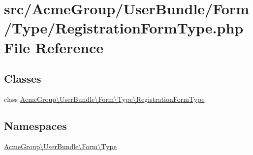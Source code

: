 \hypertarget{_registration_form_type_8php}{\section{src/\+Acme\+Group/\+User\+Bundle/\+Form/\+Type/\+Registration\+Form\+Type.php File Reference}
\label{_registration_form_type_8php}
}
\subsection*{Classes}
\begin{DoxyCompactItemize}
\item 
class \hyperlink{class_acme_group_1_1_user_bundle_1_1_form_1_1_type_1_1_registration_form_type}{Acme\+Group\textbackslash{}\+User\+Bundle\textbackslash{}\+Form\textbackslash{}\+Type\textbackslash{}\+Registration\+Form\+Type}
\end{DoxyCompactItemize}
\subsection*{Namespaces}
\begin{DoxyCompactItemize}
\item 
 \hyperlink{namespace_acme_group_1_1_user_bundle_1_1_form_1_1_type}{Acme\+Group\textbackslash{}\+User\+Bundle\textbackslash{}\+Form\textbackslash{}\+Type}
\end{DoxyCompactItemize}
